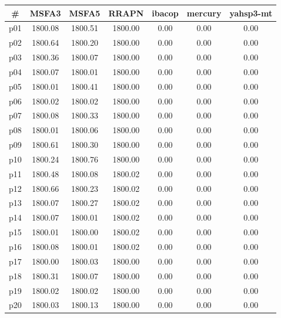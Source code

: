 \begin{tabular}{ccccccc}
\toprule
\textbf{\#} & \textbf{MSFA3} & \textbf{MSFA5} & \textbf{RRAPN} & \textbf{ibacop} & \textbf{mercury} & \textbf{yahsp3-mt}\\
\midrule
p01 & 1800.08 & 1800.51 & 1800.00 & 0.00 & 0.00 & 0.00\\
p02 & 1800.64 & 1800.20 & 1800.00 & 0.00 & 0.00 & 0.00\\
p03 & 1800.36 & 1800.07 & 1800.00 & 0.00 & 0.00 & 0.00\\
p04 & 1800.07 & 1800.01 & 1800.00 & 0.00 & 0.00 & 0.00\\
p05 & 1800.01 & 1800.41 & 1800.00 & 0.00 & 0.00 & 0.00\\
p06 & 1800.02 & 1800.02 & 1800.00 & 0.00 & 0.00 & 0.00\\
p07 & 1800.08 & 1800.33 & 1800.00 & 0.00 & 0.00 & 0.00\\
p08 & 1800.01 & 1800.06 & 1800.00 & 0.00 & 0.00 & 0.00\\
p09 & 1800.61 & 1800.30 & 1800.00 & 0.00 & 0.00 & 0.00\\
p10 & 1800.24 & 1800.76 & 1800.00 & 0.00 & 0.00 & 0.00\\
p11 & 1800.48 & 1800.08 & 1800.02 & 0.00 & 0.00 & 0.00\\
p12 & 1800.66 & 1800.23 & 1800.02 & 0.00 & 0.00 & 0.00\\
p13 & 1800.07 & 1800.27 & 1800.02 & 0.00 & 0.00 & 0.00\\
p14 & 1800.07 & 1800.01 & 1800.02 & 0.00 & 0.00 & 0.00\\
p15 & 1800.01 & 1800.00 & 1800.02 & 0.00 & 0.00 & 0.00\\
p16 & 1800.08 & 1800.01 & 1800.02 & 0.00 & 0.00 & 0.00\\
p17 & 1800.00 & 1800.03 & 1800.00 & 0.00 & 0.00 & 0.00\\
p18 & 1800.31 & 1800.07 & 1800.00 & 0.00 & 0.00 & 0.00\\
p19 & 1800.02 & 1800.02 & 1800.00 & 0.00 & 0.00 & 0.00\\
p20 & 1800.03 & 1800.13 & 1800.00 & 0.00 & 0.00 & 0.00\\
\bottomrule
\end{tabular}

